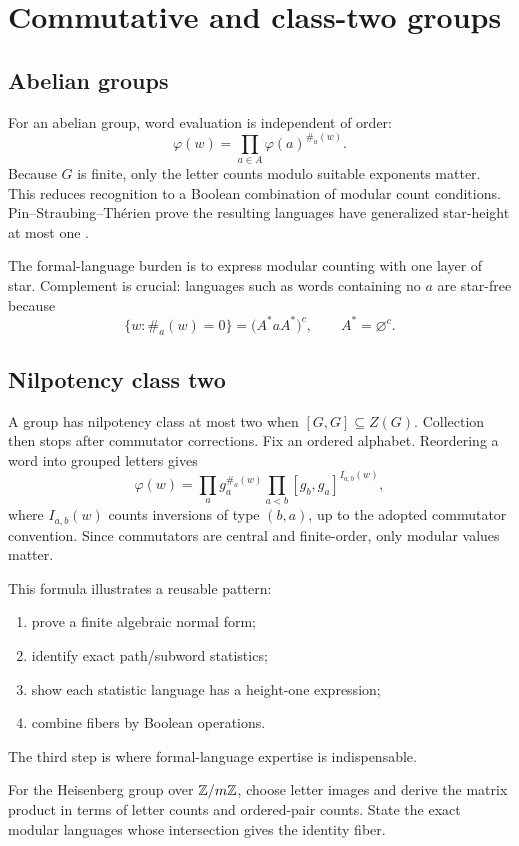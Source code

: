 \documentclass{amsart}
\begin{document}
\section{Commutative and class-two groups}

\subsection{Abelian groups}

For an abelian group, word evaluation is independent of order:
\[
  \varphi(w)=\prod_{a\in A}\varphi(a)^{\#_a(w)}.
\]
Because $G$ is finite, only the letter counts modulo suitable exponents matter.  This reduces recognition to a Boolean combination of modular count conditions.  Pin--Straubing--Th\'erien prove the resulting languages have generalized star-height at most one \cite{pinStraubingTherien1992}.

The formal-language burden is to express modular counting with one layer of star.  Complement is crucial: languages such as words containing no $a$ are star-free because
\[
  \{w:\#_a(w)=0\}=\bigl(A^\ast a A^\ast\bigr)^c,
  \qquad A^\ast=\varnothing^c.
\]

\subsection{Nilpotency class two}

A group has nilpotency class at most two when $[G,G]\subseteq Z(G)$.  Collection then stops after commutator corrections.  Fix an ordered alphabet.  Reordering a word into grouped letters gives
\[
\varphi(w)=
  \prod_a g_a^{\#_a(w)}
  \prod_{a<b}[g_b,g_a]^{I_{a,b}(w)},
\]
where $I_{a,b}(w)$ counts inversions of type $(b,a)$, up to the adopted commutator convention.  Since commutators are central and finite-order, only modular values matter.

This formula illustrates a reusable pattern:
\begin{enumerate}
  \item prove a finite algebraic normal form;
  \item identify exact path/subword statistics;
  \item show each statistic language has a height-one expression;
  \item combine fibers by Boolean operations.
\end{enumerate}
The third step is where formal-language expertise is indispensable.

\begin{exercise}
For the Heisenberg group over $\mathbb{Z}/m\mathbb{Z}$, choose letter images and derive the matrix product in terms of letter counts and ordered-pair counts.  State the exact modular languages whose intersection gives the identity fiber.
\end{exercise}
\end{document}
